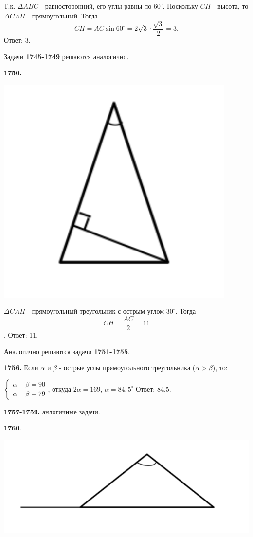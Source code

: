 Т.к. $\Delta ABC$ - равносторонний, его углы равны по $60^\circ$. Поскольку $CH$ - высота, то $\Delta CAH$ - прямоугольный. Тогда 
\[
CH = AC \sin{60^\circ} = 2\sqrt{3}\cdot\frac{\sqrt{3}}{2} = 3.
\] \null \hspace*{\fill} Ответ: 3.

Задачи \textbf{1745-1749} решаются аналогично.

\textbf{1750.}

{\centering \includegraphics[width=0.4\linewidth]{Geometry/Content/4.png}
	
}

$\Delta CAH$ -  прямоугольный треугольник с острым углом $30^\circ$. Тогда
\[
CH = \frac{AC}{2} = 11
\].\null \hspace*{\fill} Ответ: 11.

Аналогично решаются задачи \textbf{1751-1755}.

\textbf{1756.} Если $\alpha$ и $\beta$ - острые углы прямоугольного треугольника ($\alpha > \beta$), то:

{\centering $
\begin{cases}
	\alpha + \beta = 90 \\
	\alpha - \beta = 79
\end{cases}
$, откуда $2\alpha = 169$, $\alpha = 84,5^\circ$ \newline \null \hspace*{\fill} Ответ: 84,5.

}

\textbf{1757-1759.} анлогичные задачи.

\textbf{1760.}

{\centering \includegraphics[width=0.6\linewidth]{Geometry/Content/5.png}

}

